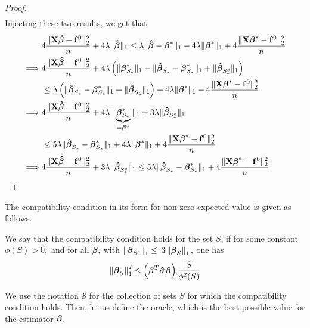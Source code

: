 \begin{proof}
\begin{align*}
    \end{align*}
    Injecting these two results, we get that
    \begin{align*}
                 & 4 \frac{\| \mathbf{X} \boldsymbol{\hat{\beta}} - \mathbf{f}^0 \|_{2}^{2}}{n} + 4 \lambda\| \boldsymbol{\hat{\beta}} \|_{1} \leq \lambda \| \boldsymbol{\hat{\beta}} - \boldsymbol{\beta}^* \|_{1} + 4 \lambda \| \boldsymbol{\beta}^*\|_{1} + 4\frac{\|\mathbf{X} \boldsymbol{\beta}^* - \mathbf{f}^0\|_{2}^{2}}{n} \\
        \implies &
        4 \frac{\| \mathbf{X} \boldsymbol{\hat{\beta}} - \mathbf{f}^0 \|_{2}^{2}}{n} + 4 \lambda \left( \|\boldsymbol{\beta}_{S_{*}}^{*} \|_{1} - \|\boldsymbol{\hat{\beta}}_{S_{*}}-\boldsymbol{\beta}_{S_{*}}^{*} \|_{1}+ \|\boldsymbol{\hat{\beta}}_{S_{*}^{c}} \|_{1} \right)                                \\
                 & \leq \lambda \left( \| \boldsymbol{\hat{\beta}}_{S_{*}}-\boldsymbol{\beta}_{S_{*}}^{*} \|_{1} + \|\boldsymbol{\hat{\beta}}_{S_{*}^{c}} \|_{1} \right) + 4 \lambda \| \boldsymbol{\beta}^*\|_{1} + 4\frac{\|\mathbf{X} \boldsymbol{\beta}^* - \mathbf{f}^0\|_{2}^{2}}{n}                    \\
        \implies &
        4 \frac{\| \mathbf{X} \boldsymbol{\hat{\beta}} - \mathbf{f}^0 \|_{2}^{2}}{n} + 4 \lambda \| \underbrace{\boldsymbol{\beta}_{S_{*}}^{*}}_{= \boldsymbol{\beta}^{*}} \|_{1} + 3 \lambda\|\boldsymbol{\hat{\beta}}_{S_{*}^{c}} \|_{1}                                                      \\
                 & \leq 5 \lambda \| \boldsymbol{\hat{\beta}}_{S_{*}}-\boldsymbol{\beta}_{S_{*}}^{*} \|_{1} + 4 \lambda \| \boldsymbol{\beta}^*\|_{1} + 4\frac{\|\mathbf{X} \boldsymbol{\beta}^* - \mathbf{f}^0\|_{2}^{2}}{n}                                                                \\
        \implies &
        4 \frac{\| \mathbf{X} \boldsymbol{\hat{\beta}} - \mathbf{f}^0 \|_{2}^{2}}{n} + 3 \lambda\|\boldsymbol{\hat{\beta}}_{S_{*}^{c}} \|_{1} \leq 5 \lambda \| \boldsymbol{\hat{\beta}}_{S_{*}}-\boldsymbol{\beta}_{S_{*}}^{*} \|_{1} + 4\frac{\|\mathbf{X} \boldsymbol{\beta}^* - \mathbf{f}^0\|_{2}^{2}}{n}           \\
    \end{align*}
\end{proof}
The compatibility condition in its form for non-zero expected value is given as follows.
\begin{definition}
    We say that the compatibility condition holds for the set $S$, if for some constant $\phi(S)>0,$ and for all $\boldsymbol{\beta},$ with $\left\|\boldsymbol{\beta}_{S^{c}}\right\|_{1} \leq$ $3\left\|\boldsymbol{\beta}_{S}\right\|_{1},$ one has
    \[
        \left\|\boldsymbol{\beta}_{S}\right\|_{1}^{2} \leq\left(\boldsymbol{\beta}^{T} \boldsymbol{\hat{\sigma}} \boldsymbol{\beta}\right)\frac{|S|}{\phi^{2}(S)}
    \]
\end{definition}
We use the notation $\mathscr{S}$ for the collection of sets $S$ for which the compatibility condition holds. Then, let us define the oracle, which is the best possible value for the estimator \(\boldsymbol{\beta}\).
